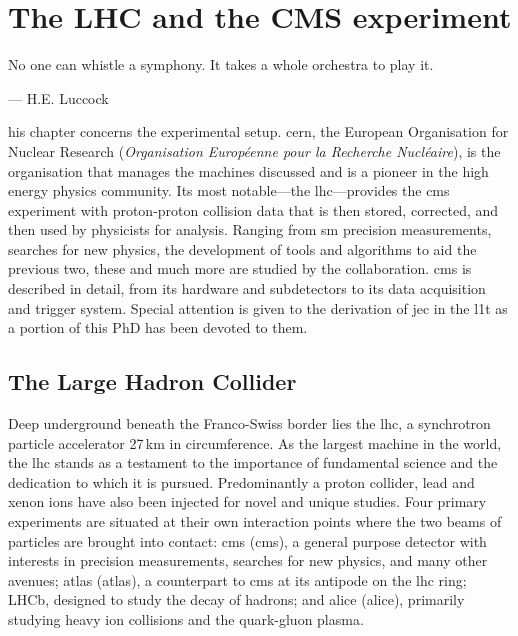 \chapter{The LHC and the CMS experiment}
\label{chap:detector}

\epigraph{No one can whistle a symphony. It takes a whole orchestra to play it.}{--- H.E. Luccock}

his chapter concerns the experimental setup. \acrshort{cern}, the European Organisation for Nuclear Research (\emph{Organisation Europ\'{e}enne pour la Recherche Nucl\'{e}aire}), is the organisation that manages the machines discussed and is a pioneer in the high energy physics community. Its most notable---the \acrlong{lhc}---provides the \acrshort{cms} experiment with proton-proton collision data that is then stored, corrected, and then used by physicists for analysis. Ranging from \acrlong{sm} precision measurements, searches for new physics, the development of tools and algorithms to aid the previous two, these and much more are studied by the collaboration. \acrshort{cms} is described in detail, from its hardware and subdetectors to its data acquisition and trigger system. Special attention is given to the derivation of \acrfull{jec} in the \acrfull{l1t} as a portion of this PhD has been devoted to them.




\section{The Large Hadron Collider}
\label{sec:detector_lhc}

Deep underground beneath the Franco-Swiss border lies the \acrfull{lhc}, a synchrotron particle accelerator 27\,km in circumference. As the largest machine in the world, the \acrshort{lhc} stands as a testament to the importance of fundamental science and the dedication to which it is pursued. Predominantly a proton collider, lead and xenon ions have also been injected for novel and unique studies. Four primary experiments are situated at their own interaction points where the two beams of particles are brought into contact: \acrshort{cms} (\acrlong{cms}), a general purpose detector with interests in precision measurements, searches for new physics, and many other avenues; \acrshort{atlas} (\acrlong{atlas}), a counterpart to \acrshort{cms} at its antipode on the \acrshort{lhc} ring; LHCb, designed to study the decay of \PB hadrons; and \acrshort{alice} (\acrlong{alice}), primarily studying heavy ion collisions and the quark-gluon plasma.

